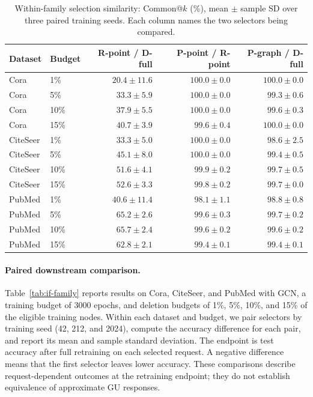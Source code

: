 \begin{table}[htbp]
\centering
\small
\setlength{\tabcolsep}{4pt}
\caption{Within-family selection similarity: Common@$k$ (\%), mean $\pm$ sample SD over three paired training seeds. Each column names the two selectors being compared.}
\label{tab:if-similarity}
\begin{tabular}{llrrr}
\toprule
Dataset & Budget & R-point / D-full & P-point / R-point & P-graph / D-full \\
\midrule
Cora & 1\% & $20.4\pm11.6$ & $100.0\pm0.0$ & $100.0\pm0.0$ \\
Cora & 5\% & $33.3\pm5.9$ & $100.0\pm0.0$ & $99.3\pm0.6$ \\
Cora & 10\% & $37.9\pm5.5$ & $100.0\pm0.0$ & $99.6\pm0.3$ \\
Cora & 15\% & $40.7\pm3.9$ & $99.6\pm0.4$ & $100.0\pm0.0$ \\
CiteSeer & 1\% & $33.3\pm5.0$ & $100.0\pm0.0$ & $98.6\pm2.5$ \\
CiteSeer & 5\% & $45.1\pm8.0$ & $100.0\pm0.0$ & $99.4\pm0.5$ \\
CiteSeer & 10\% & $51.6\pm4.1$ & $99.9\pm0.2$ & $99.7\pm0.5$ \\
CiteSeer & 15\% & $52.6\pm3.3$ & $99.8\pm0.2$ & $99.7\pm0.0$ \\
PubMed & 1\% & $40.6\pm11.4$ & $98.1\pm1.1$ & $98.8\pm0.8$ \\
PubMed & 5\% & $65.2\pm2.6$ & $99.6\pm0.3$ & $99.7\pm0.2$ \\
PubMed & 10\% & $65.7\pm2.4$ & $99.6\pm0.2$ & $99.6\pm0.2$ \\
PubMed & 15\% & $62.8\pm2.1$ & $99.4\pm0.1$ & $99.4\pm0.1$ \\
\bottomrule
\end{tabular}
\end{table}

\clearpage
\paragraph{Paired downstream comparison.}
Table~\ref{tab:if-family} reports results on Cora, CiteSeer, and PubMed with GCN, a training budget of 3000 epochs, and deletion budgets of 1\%, 5\%, 10\%, and 15\% of the eligible training nodes. Within each dataset and budget, we pair selectors by training seed (42, 212, and 2024), compute the accuracy difference for each pair, and report its mean and sample standard deviation. The endpoint is test accuracy after full retraining on each selected request. A negative difference means that the first selector leaves lower accuracy. These comparisons describe request-dependent outcomes at the retraining endpoint; they do not establish equivalence of approximate GU responses.

